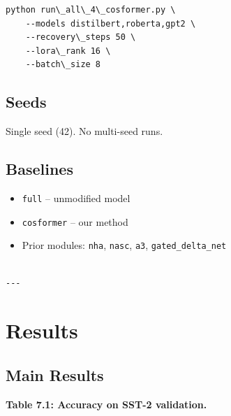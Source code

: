 \begin{lstlisting}
python run\_all\_4\_cosformer.py \
    --models distilbert,roberta,gpt2 \
    --recovery\_steps 50 \
    --lora\_rank 16 \
    --batch\_size 8
\end{lstlisting}

\subsection{Seeds}

Single seed (42). No multi-seed runs.

\subsection{Baselines}

\begin{itemize}
\item \texttt{full} -- unmodified model
\item \texttt{cosformer} -- our method
\item Prior modules: \texttt{nha}, \texttt{nasc}, \texttt{a3}, \texttt{gated\_delta\_net}
\end{itemize}
\begin{lstlisting}

---
\end{lstlisting}


\section{Results}

\subsection{Main Results}

\textbf{Table 7.1: Accuracy on SST-2 validation.}

